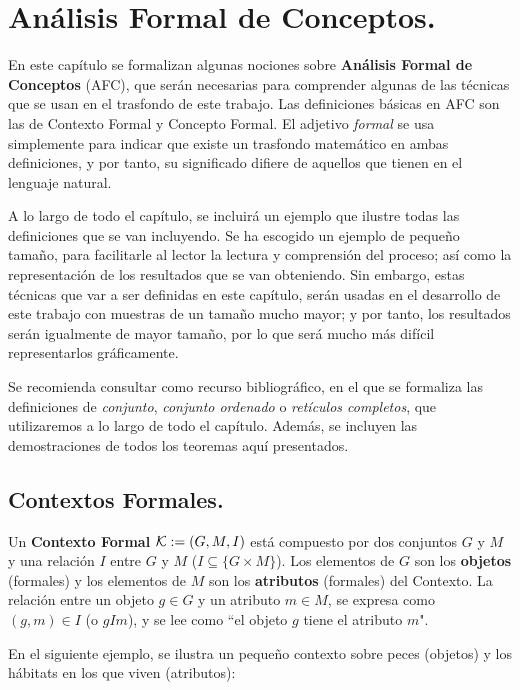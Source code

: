 \chapter{Análisis Formal de Conceptos.}\label{cap:capitulo2}

En este capítulo se formalizan algunas nociones sobre {\bf Análisis Formal de Conceptos} (AFC), que serán necesarias para comprender algunas de las técnicas que se usan en el trasfondo de este trabajo. Las definiciones básicas en AFC son las de Contexto Formal y Concepto Formal. El adjetivo \emph{formal} se usa simplemente para indicar que existe un trasfondo matemático en ambas definiciones, y por tanto, su significado difiere de aquellos que tienen en el lenguaje natural.

A lo largo de todo el capítulo, se incluirá un ejemplo que ilustre todas las definiciones que se van incluyendo. Se ha escogido un ejemplo de pequeño tamaño, para facilitarle al lector la lectura y comprensión del proceso; así como la representación de los resultados que se van obteniendo. Sin embargo, estas técnicas que var a ser definidas en este capítulo, serán usadas en el desarrollo de este trabajo con muestras de un tamaño mucho mayor; y por tanto, los resultados serán igualmente de mayor tamaño, por lo que será mucho más difícil representarlos gráficamente.

Se recomienda consultar \cite{afc} como recurso bibliográfico, en el que se formaliza las definiciones de \emph{conjunto}, \emph{conjunto ordenado} o \emph{retículos completos}, que utilizaremos a lo largo de todo el capítulo. Además, se incluyen las demostraciones de todos los teoremas aquí presentados.

\section{Contextos Formales.}

\begin{defi}
	Un {\bf Contexto Formal} ${\cal K} := (G, M, I)$ está compuesto por dos conjuntos $G$ y $M$ y una relación $I$ entre $G$ y $M$ ($I \subseteq \{G \times{M}\}$). Los elementos de $G$ son los {\bf objetos} (formales) y los elementos de $M$ son los {\bf atributos} (formales) del Contexto. La relación entre un objeto $g\in{G}$ y un atributo $m\in{M}$, se expresa como $(g,m)\in{I}$ (o $gIm$), y se lee como ``el objeto $g$ tiene el atributo $m$".
\end{defi}

En el siguiente ejemplo, se ilustra un pequeño contexto sobre peces (objetos) y los hábitats en los que viven (atributos):

